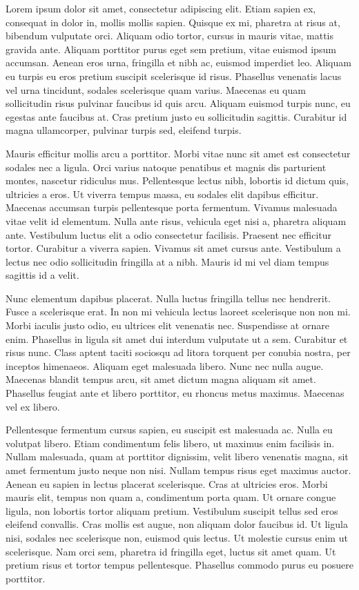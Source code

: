 Lorem ipsum dolor sit amet, consectetur adipiscing elit. Etiam sapien ex, consequat in dolor in, mollis mollis sapien. Quisque ex mi, pharetra at risus at, bibendum vulputate orci. Aliquam odio tortor, cursus in mauris vitae, mattis gravida ante. Aliquam porttitor purus eget sem pretium, vitae euismod ipsum accumsan. Aenean eros urna, fringilla et nibh ac, euismod imperdiet leo. Aliquam eu turpis eu eros pretium suscipit scelerisque id risus. Phasellus venenatis lacus vel urna tincidunt, sodales scelerisque quam varius. Maecenas eu quam sollicitudin risus pulvinar faucibus id quis arcu. Aliquam euismod turpis nunc, eu egestas ante faucibus at. Cras pretium justo eu sollicitudin sagittis. Curabitur id magna ullamcorper, pulvinar turpis sed, eleifend turpis.

Mauris efficitur mollis arcu a porttitor. Morbi vitae nunc sit amet est consectetur sodales nec a ligula. Orci varius natoque penatibus et magnis dis parturient montes, nascetur ridiculus mus. Pellentesque lectus nibh, lobortis id dictum quis, ultricies a eros. Ut viverra tempus massa, eu sodales elit dapibus efficitur. Maecenas accumsan turpis pellentesque porta fermentum. Vivamus malesuada vitae velit id elementum. Nulla ante risus, vehicula eget nisi a, pharetra aliquam ante. Vestibulum luctus elit a odio consectetur facilisis. Praesent nec efficitur tortor. Curabitur a viverra sapien. Vivamus sit amet cursus ante. Vestibulum a lectus nec odio sollicitudin fringilla at a nibh. Mauris id mi vel diam tempus sagittis id a velit.

Nunc elementum dapibus placerat. Nulla luctus fringilla tellus nec hendrerit. Fusce a scelerisque erat. In non mi vehicula lectus laoreet scelerisque non non mi. Morbi iaculis justo odio, eu ultrices elit venenatis nec. Suspendisse at ornare enim. Phasellus in ligula sit amet dui interdum vulputate ut a sem. Curabitur et risus nunc. Class aptent taciti sociosqu ad litora torquent per conubia nostra, per inceptos himenaeos. Aliquam eget malesuada libero. Nunc nec nulla augue. Maecenas blandit tempus arcu, sit amet dictum magna aliquam sit amet. Phasellus feugiat ante et libero porttitor, eu rhoncus metus maximus. Maecenas vel ex libero.

Pellentesque fermentum cursus sapien, eu suscipit est malesuada ac. Nulla eu volutpat libero. Etiam condimentum felis libero, ut maximus enim facilisis in. Nullam malesuada, quam at porttitor dignissim, velit libero venenatis magna, sit amet fermentum justo neque non nisi. Nullam tempus risus eget maximus auctor. Aenean eu sapien in lectus placerat scelerisque. Cras at ultricies eros. Morbi mauris elit, tempus non quam a, condimentum porta quam. Ut ornare congue ligula, non lobortis tortor aliquam pretium. Vestibulum suscipit tellus sed eros eleifend convallis. Cras mollis est augue, non aliquam dolor faucibus id. Ut ligula nisi, sodales nec scelerisque non, euismod quis lectus. Ut molestie cursus enim ut scelerisque. Nam orci sem, pharetra id fringilla eget, luctus sit amet quam. Ut pretium risus et tortor tempus pellentesque. Phasellus commodo purus eu posuere porttitor.

